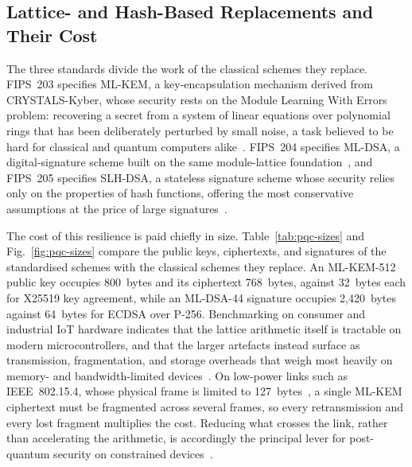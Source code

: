 \subsection{Lattice- and Hash-Based Replacements and Their Cost}
\label{subsec:bg-pqc-primitives}

The three standards divide the work of the classical schemes they replace.
FIPS~203 specifies ML-KEM, a key-encapsulation mechanism derived from
CRYSTALS-Kyber, whose security rests on the Module Learning With Errors problem:
recovering a secret from a system of linear equations over polynomial rings that
has been deliberately perturbed by small noise, a task believed to be hard for
classical and quantum computers alike~\cite{fips203}. FIPS~204 specifies ML-DSA,
a digital-signature scheme built on the same module-lattice
foundation~\cite{fips204}, and FIPS~205 specifies SLH-DSA, a stateless
signature scheme whose security relies only on the properties of hash functions,
offering the most conservative assumptions at the price of large
signatures~\cite{fips205}.

The cost of this resilience is paid chiefly in size. Table~\ref{tab:pqc-sizes}
and Fig.~\ref{fig:pqc-sizes} compare the public keys, ciphertexts, and
signatures of the standardised schemes with the classical schemes they replace.
An ML-KEM-512 public key occupies 800~bytes and its ciphertext 768~bytes, against
32~bytes each for X25519 key agreement, while an ML-DSA-44 signature occupies
2{,}420~bytes against 64~bytes for ECDSA over P-256. Benchmarking on consumer and
industrial IoT hardware indicates that the lattice arithmetic itself is
tractable on modern microcontrollers, and that the larger artefacts instead
surface as transmission, fragmentation, and storage overheads that weigh most
heavily on memory- and bandwidth-limited
devices~\cite{fitzgibbon2024constrained, hanna2025comprehensive,
cruz2025measuring}. On low-power links such as IEEE~802.15.4, whose physical
frame is limited to 127~bytes~\cite{ieee802154}, a single ML-KEM ciphertext must
be fragmented across several frames, so every retransmission and every lost
fragment multiplies the cost. Reducing what crosses the link, rather than
accelerating the arithmetic, is accordingly the principal lever for post-quantum
security on constrained devices~\cite{castiglione2024integrating}.

